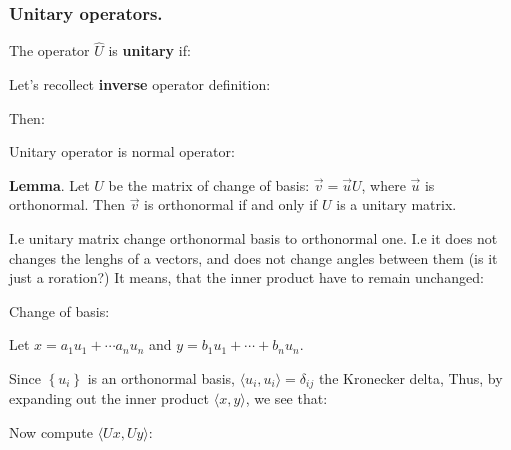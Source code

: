 \documentclass{article}
\begin{document}
\subsubsection{Unitary operators.}

The operator $\hat{U}$ is \textbf{unitary} if:


Let's recollect \textbf{inverse} operator definition:


Then:


Unitary operator is normal operator:





\textbf{Lemma}. Let $U$ be the matrix of change of basis: $\vec{v} = \vec{u}U$, where $\vec{u}$ is orthonormal. Then $\vec{v}$ is orthonormal if and only if $U$ is a unitary matrix.

I.e unitary matrix change orthonormal basis to orthonormal one. I.e it does not changes the lenghs of a vectors, and does not change angles between them (is it just a roration?) It means, that the inner product have to remain unchanged:


Change of basis:


Let $x = a_1 u_1 + \cdots a_n u_n$ and $y = b_1 u_1 + \cdots + b_n u_n$. 

Since $\left\lbrace  u_i \right\rbrace$ is an orthonormal basis, $\langle u_i, u_i \rangle = \delta_{ij}$ the Kronecker delta, Thus, by expanding out the inner product $\langle x,y \rangle$, we see that:



Now compute $\langle Ux, Uy \rangle$:

\end{document}
